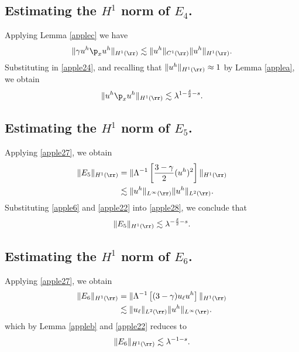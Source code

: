 \subsection{Estimating the $H^1$ norm of $\hyperref[all_errors_together]{E_4}$.} Applying Lemma \ref{applec} we have
\begin{equation}
	\begin{split}
		\|\gamma u^h \p_x u^h\|_{H^1(\rr)} \lesssim \|u^h\|_{C^1(\rr)}
		\|u^h\|_{H^1(\rr)}.
		\label{apple25}
	\end{split}
\end{equation}
Substituting in \eqref{apple24}, and recalling that $\|u^h\|_{H^1(\rr)} \approx 1$ by Lemma
\ref{applea}, we obtain
\begin{equation}
	\begin{split}
		\|u^h \p_x u^h \|_{H^1(\rr)} \lesssim \lambda^{1-\frac{\delta}{2}-s}.
		\label{apple26}
	\end{split}
\end{equation}
%
%
\subsection{Estimating the $H^1$ norm of $\hyperref[all_errors_together]{E_5}$.}
Applying \eqref{apple27}, we obtain
\begin{equation}
	\begin{split}
		\|E_5\|_{H^1(\rr)}
		& = \|\Lambda^{-1}\left[ \frac{3-\gamma}{2}(u^h)^2
		\right]\|_{H^1(\rr)}
		\\
		& \lesssim \|u^h\|_{L^\infty(\rr)} \|u^h\|_{L^2(\rr)}.
		\label{apple28}
	\end{split}
\end{equation}
Substituting \eqref{apple6} and \eqref{apple22} into \eqref{apple28}, we conclude that
\begin{equation}
	\begin{split}
		\|E_5\|_{H^1(\rr)} \lesssim \lambda^{-\frac{\delta}{2}-s}.
		\label{apple29}
	\end{split}
\end{equation}
%
%
%
%
\subsection{Estimating the $H^1$ norm of $\hyperref[all_errors_together]{E_6}$.} Applying \eqref{apple27}, we obtain
\begin{equation}
	\begin{split}
		\|E_6\|_{H^1(\rr)} 
		& = \|\Lambda^{-1} \left[ (3 -\gamma) u_\ell u^h \right]\|_{H^1(\rr)}
		\\
		& \lesssim \|u_\ell\|_{L^2(\rr)} \|u^h\|_{L^\infty(\rr)}.
		\label{apple30}
	\end{split}
\end{equation}
which by Lemma \ref{appleb} and \eqref{apple22} reduces to
\begin{equation}
	\begin{split}
		\|E_6\|_{H^1(\rr)} \lesssim \lambda^{-1-s}.
		\label{apple31}
	\end{split}
\end{equation}
%
%
%
%
